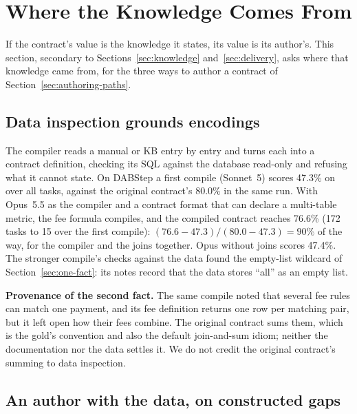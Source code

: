 \section{Where the Knowledge Comes From}
\label{sec:authoring}

If the contract's value is the knowledge it states, its value is its
author's. This section, secondary to Sections~\ref{sec:knowledge}
and~\ref{sec:delivery}, asks where that knowledge came from, for the three
ways to author a contract of Section~\ref{sec:authoring-paths}.

\subsection{Data inspection grounds encodings}
\label{sec:compiled}
\label{sec:better-compile}

The compiler reads a manual or KB entry by entry and turns each into a
contract definition, checking its SQL against the database read-only and
refusing what it cannot state. On DABStep a first compile (Sonnet~5)
scores 47.3\% on \mLuna{} over all tasks, against the original contract's
80.0\% in the same run. With Opus~5.5 as the compiler and a contract
format that can declare a multi-table metric, the fee formula compiles,
and the compiled contract reaches 76.6\% (172 tasks to 15 over the first
compile): $(76.6-47.3)/(80.0-47.3)=90\%$ of the way, for the compiler and
the joins together. Opus without joins scores 47.4\%. The stronger
compile's checks against the data found the empty-list wildcard of
Section~\ref{sec:one-fact}: its notes record that the data stores ``all''
as an empty list.

\textbf{Provenance of the second fact.} The same compile noted that
several fee rules can match one payment, and its fee definition returns one
row per matching pair, but it left open how their fees combine. The
original contract sums them, which is the gold's convention and also the
default join-and-sum idiom; neither the documentation nor the data settles
it. We do not credit the original contract's summing to data inspection.

\subsection{An author with the data, on constructed gaps}
\label{sec:gaps}

